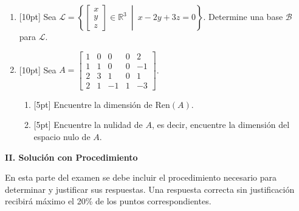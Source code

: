 \documentclass[11pt]{article}
\begin{document}
\begin{enumerate}
\vspace{4pt}

\item{}[10pt] Sea $\mathcal{L}=\left\{\begin{bmatrix}x\\y\\z\end{bmatrix}\in\mathbb{R}^3\ \middle|\ x-2y+3z=0\right\}$. Determine una base $\mathcal{B}$ para $\mathcal{L}$.

\vspace{4pt}

\item{}[10pt] Sea $A = \begin{bmatrix}1&0&0&0&2\\1&1&0&0&-1\\2&3&1&0&1\\2&1&-1&1&-3\end{bmatrix}$.
\begin{enumerate}
\item{}[5pt] Encuentre la dimensión de $\mathrm{Ren}(A)$.

\vspace{4pt}

\item{}[5pt] Encuentre la nulidad de $A$, es decir, encuentre la dimensión del espacio nulo de $A$.

\vspace{4pt}
\end{enumerate}
\end{enumerate}

\vspace{6pt}
\noindent\textbf{\large II. Solución con Procedimiento}

\vspace{4pt}
\noindent En esta parte del examen se debe incluir el procedimiento necesario para determinar y justificar sus respuestas. Una respuesta correcta sin justificación recibirá máximo el 20\% de los puntos correspondientes.
\end{document}
